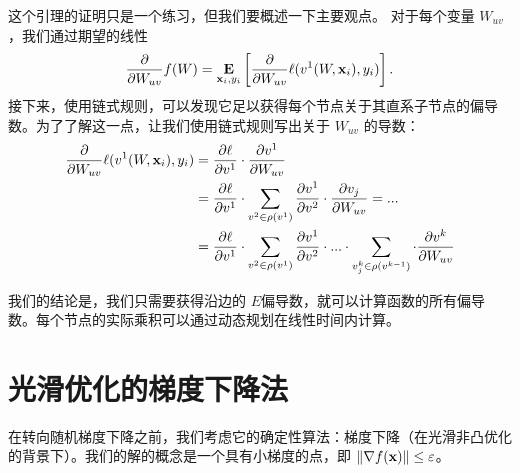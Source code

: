 这个引理的证明只是一个练习，但我们要概述一下主要观点。
对于每个变量 $W_{uv}$，我们通过期望的线性
$$ \frac{\partial }{\partial W_{uv} } f (W) =   \mathop{\mbox{\bf E}}_{\mathbf x_i,y_i} \left[ \frac{\partial}{\partial W_{uv} }  \ell( v^{1} (W,\mathbf x_i) , y_i)  \right] . $$
接下来，使用链式规则，可以发现它足以获得每个节点关于其直系子节点的偏导数。为了了解这一点，让我们使用链式规则写出关于 $W_{uv}$ 的导数：
\begin{align*}
 \frac{\partial }{\partial W_{uv} }  \ell( v^{1} (W,\mathbf x_i) , y_i)   & = \frac{\partial \ell }{\partial v^1 } \cdot  \frac{\partial v^1}{\partial W_{uv} } \\
& =  \frac{\partial \ell }{\partial v^1 } \cdot \sum_{v^2 \in \rho(v^1) }  \frac{\partial v^1}{\partial v^2 } \cdot   \frac{\partial v_j}{\partial W_{uv}} = ... \\
& =  \frac{\partial \ell }{\partial v^1 } \cdot \sum_{v^2 \in \rho(v^1) }  \frac{\partial v^1}{\partial v^2 } \cdot ... \cdot \sum_{v_j^k \in \rho(v^{k-1}) }  \cdot  \frac{\partial v^{k} }{\partial W_{uv}}  \\
\end{align*}

我们的结论是，我们只需要获得沿边的 $E$偏导数，就可以计算函数的所有偏导数。每个节点的实际乘积可以通过动态规划在线性时间内计算。



\section{
    光滑优化的梯度下降法
    }


在转向随机梯度下降之前，我们考虑它的确定性算法：梯度下降（在光滑非凸优化的背景下）。我们的解的概念是一个具有小梯度的点，即 $ \| \nabla f(\mathbf x) \| \leq \varepsilon$。

